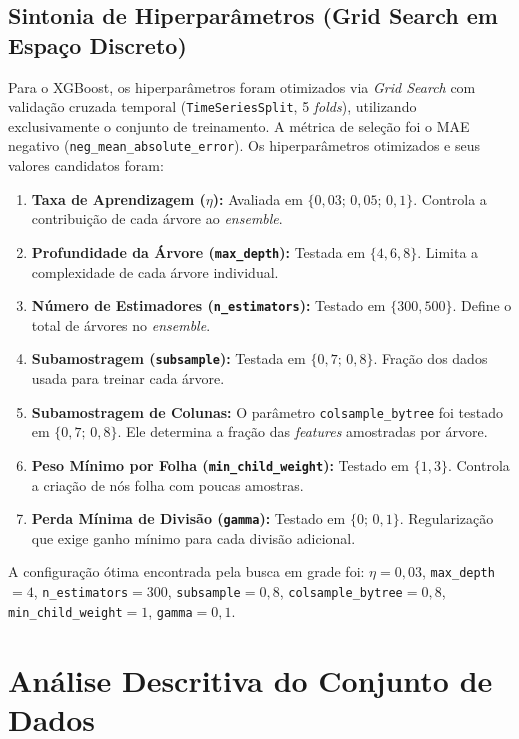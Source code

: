 \subsection{Sintonia de Hiperparâmetros (Grid Search em Espaço Discreto)}
Para o XGBoost, os hiperparâmetros foram otimizados via \textit{Grid Search} com validação cruzada temporal (\texttt{TimeSeriesSplit}, 5 \textit{folds}), utilizando exclusivamente o conjunto de treinamento. A métrica de seleção foi o MAE negativo (\texttt{neg\_mean\_absolute\_error}). Os hiperparâmetros otimizados e seus valores candidatos foram:
\begin{enumerate}
    \item \textbf{Taxa de Aprendizagem ($\eta$):} Avaliada em $\{0{,}03;\, 0{,}05;\, 0{,}1\}$. Controla a contribuição de cada árvore ao \textit{ensemble}.
    \item \textbf{Profundidade da Árvore (\texttt{max\_depth}):} Testada em $\{4, 6, 8\}$. Limita a complexidade de cada árvore individual.
    \item \textbf{Número de Estimadores (\texttt{n\_estimators}):} Testado em $\{300, 500\}$. Define o total de árvores no \textit{ensemble}.
    \item \textbf{Subamostragem (\texttt{subsample}):} Testada em $\{0{,}7;\, 0{,}8\}$. Fração dos dados usada para treinar cada árvore.
    \item \textbf{Subamostragem de Colunas:} O parâmetro \texttt{colsample}\allowbreak\texttt{\_bytree} foi testado em $\{0{,}7;\, 0{,}8\}$. Ele determina a fração das \textit{features} amostradas por árvore.
    \item \textbf{Peso Mínimo por Folha (\texttt{min\_child\_weight}):} Testado em $\{1, 3\}$. Controla a criação de nós folha com poucas amostras.
    \item \textbf{Perda Mínima de Divisão (\texttt{gamma}):} Testado em $\{0;\, 0{,}1\}$. Regularização que exige ganho mínimo para cada divisão adicional.
\end{enumerate}

A configuração ótima encontrada pela busca em grade foi: $\eta=0{,}03$, \texttt{max\_depth}$=4$, \texttt{n\_estimators}$=300$, \texttt{subsample}$=0{,}8$, \texttt{colsample\_bytree}$=0{,}8$, \texttt{min\_child\_weight}$=1$, \texttt{gamma}$=0{,}1$.

\section{Análise Descritiva do Conjunto de Dados}\label{sec:descritiva}

